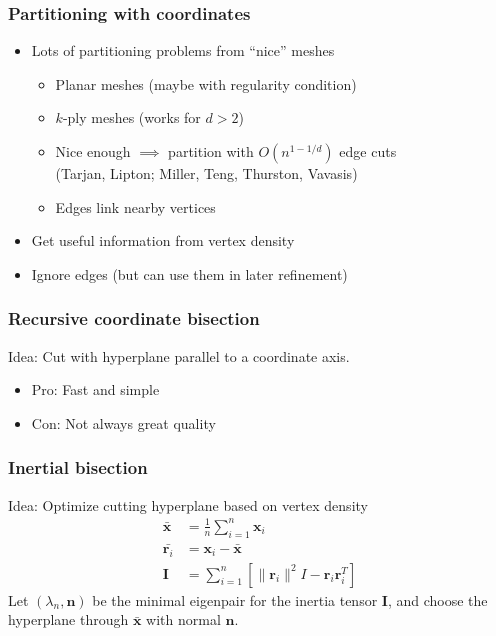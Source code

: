 \documentclass{beamer}
\newcommand{\bfx}{\mathbf{x}}
\newcommand{\bfr}{\mathbf{r}}
\newcommand{\bfn}{\mathbf{n}}
\newcommand{\bfI}{\mathbf{I}}
\begin{document}
\begin{frame}
  \frametitle{Partitioning with coordinates}

  \begin{itemize}
  \item Lots of partitioning problems from ``nice'' meshes
    \begin{itemize}
    \item Planar meshes (maybe with regularity condition)
    \item $k$-ply meshes (works for $d > 2$)
    \item Nice enough $\implies$ partition with $O(n^{1-1/d})$ edge cuts \\
      (Tarjan, Lipton; Miller, Teng, Thurston, Vavasis)
    \item Edges link nearby vertices
    \end{itemize}
  \item Get useful information from vertex density
  \item Ignore edges (but can use them in later refinement)
  \end{itemize}
  
\end{frame}


\begin{frame}
  \frametitle{Recursive coordinate bisection}

  \begin{center}
    \begin{tikzpicture}[scale=0.7]
      
    \end{tikzpicture}
  \end{center}
  
  Idea: Cut with hyperplane parallel to a coordinate axis.
  \begin{itemize}
  \item Pro: Fast and simple
  \item Con: Not always great quality
  \end{itemize}
\end{frame}


\begin{frame}
  \frametitle{Inertial bisection}

  Idea: Optimize cutting hyperplane based on vertex density
  \begin{align*}
    \bar{\bfx} &= \frac{1}{n} \sum_{i=1}^n \bfx_i \\
    \bar{\bfr_i} &= \bfx_i-\bar{\bfx} \\
    \bfI &= \sum_{i=1}^n\left[ \|\bfr_i\|^2 I - \bfr_i \bfr_i^T \right]
  \end{align*}
  Let $(\lambda_n, \bfn)$ be the minimal eigenpair for the inertia
  tensor $\bfI$, and choose the hyperplane through $\bar{\bfx}$ 
  with normal $\bfn$.  
  
\end{frame}
\end{document}
